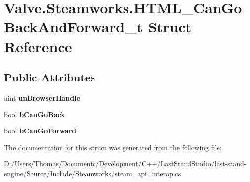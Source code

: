 \hypertarget{structValve_1_1Steamworks_1_1HTML__CanGoBackAndForward__t}{}\section{Valve.\+Steamworks.\+H\+T\+M\+L\+\_\+\+Can\+Go\+Back\+And\+Forward\+\_\+t Struct Reference}
\label{structValve_1_1Steamworks_1_1HTML__CanGoBackAndForward__t}
\subsection*{Public Attributes}
\begin{DoxyCompactItemize}
\item 
\hypertarget{structValve_1_1Steamworks_1_1HTML__CanGoBackAndForward__t_a2ea4c2182daf33f8373dcef8123bd94c}{}uint {\bfseries un\+Browser\+Handle}\label{structValve_1_1Steamworks_1_1HTML__CanGoBackAndForward__t_a2ea4c2182daf33f8373dcef8123bd94c}

\item 
\hypertarget{structValve_1_1Steamworks_1_1HTML__CanGoBackAndForward__t_aa454a8a93409d6968ba45e1b7023f5e2}{}bool {\bfseries b\+Can\+Go\+Back}\label{structValve_1_1Steamworks_1_1HTML__CanGoBackAndForward__t_aa454a8a93409d6968ba45e1b7023f5e2}

\item 
\hypertarget{structValve_1_1Steamworks_1_1HTML__CanGoBackAndForward__t_aefac452591a5d3ff0d69b5c6dbbb65ae}{}bool {\bfseries b\+Can\+Go\+Forward}\label{structValve_1_1Steamworks_1_1HTML__CanGoBackAndForward__t_aefac452591a5d3ff0d69b5c6dbbb65ae}

\end{DoxyCompactItemize}


The documentation for this struct was generated from the following file\+:\begin{DoxyCompactItemize}
\item 
D\+:/\+Users/\+Thomas/\+Documents/\+Development/\+C++/\+Last\+Stand\+Studio/last-\/stand-\/engine/\+Source/\+Include/\+Steamworks/steam\+\_\+api\+\_\+interop.\+cs\end{DoxyCompactItemize}
